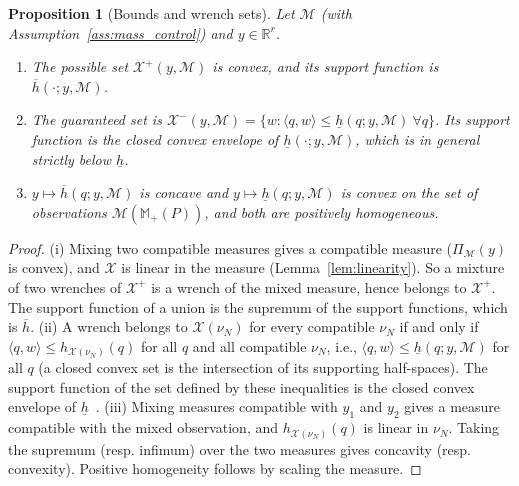 \documentclass[11pt,a4paper]{article}
\theoremstyle{plain}
\newtheorem{proposition}[theorem]{Proposition}
\newcommand{\R}{\mathbb{R}}
\newcommand{\X}{\mathcal X}
\begin{document}
\begin{proposition}[Bounds and wrench sets]
    \label{prop:inner_outer}
    Let $\mathcal M$ (with Assumption~\ref{ass:mass_control}) and $y\in\R^r$.
    \begin{enumerate}[label=(\roman*)]
        \item The possible set $\X^+(y,\mathcal M)$ is convex, and its support function is $\overline h(\cdot;y,\mathcal M)$.
        \item The guaranteed set is $\X^-(y,\mathcal M)=\{w:\langle q,w\rangle\le\underline h(q;y,\mathcal M)~\forall q\}$. Its support function is the closed convex envelope of
        $\underline h(\cdot;y,\mathcal M)$, which is in general strictly below $\underline h$.
        \item $y\mapsto\overline h(q;y,\mathcal M)$ is concave and $y\mapsto\underline h(q;y,\mathcal M)$ is convex on the set of observations $\mathcal M(\mathbb M_+(P))$, and both are
        positively homogeneous.
    \end{enumerate}
\end{proposition}
\begin{proof}
    (i) Mixing two compatible measures gives a compatible measure ($\Pi_{\mathcal M}(y)$ is convex), and $\X$ is linear in the measure (Lemma~\ref{lem:linearity}). So a mixture of two wrenches
    of $\X^+$ is a wrench of the mixed measure, hence belongs to $\X^+$. The support function of a union is the supremum of the support functions, which is $\overline h$.
    (ii) A wrench belongs to $\X(\nu_N)$ for every compatible $\nu_N$ if and only if $\langle q,w\rangle\le h_{\X(\nu_N)}(q)$ for all $q$ and all compatible $\nu_N$, i.e.,
    $\langle q,w\rangle\le\underline h(q;y,\mathcal M)$ for all $q$ (a closed convex set is the intersection of its supporting half-spaces). The support function of the set defined by these
    inequalities is the closed convex envelope of $\underline h$~\cite[Section~13]{rockafellar1970convex}.
    (iii) Mixing measures compatible with $y_1$ and $y_2$ gives a measure compatible with the mixed observation, and $h_{\X(\nu_N)}(q)$ is linear in $\nu_N$. Taking the supremum (resp. infimum)
    over the two measures gives concavity (resp. convexity). Positive homogeneity follows by scaling the measure.
\end{proof}
\end{document}
